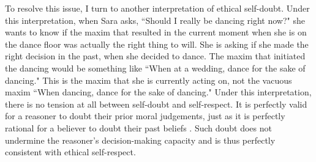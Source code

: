 \begin{isabellebody}
\begin{isamarkuptext}
To resolve this issue, I turn to another interpretation of ethical self-doubt. Under this interpretation, 
when Sara asks, ``Should I really be dancing right now?" she wants to know if the maxim that 
resulted in the current moment when she is on the dance floor was actually 
the right thing to will. She is asking if she made the right 
decision in the past, when she decided to dance. The maxim that initiated the dancing would be something 
like ``When at a wedding, dance for the sake of dancing." This is the maxim that she is currently acting 
on, not the vacuous maxim ``When dancing, dance for the sake of dancing." Under this interpretation, 
there is no tension at all between self-doubt and self-respect. It is perfectly valid for a reasoner 
to doubt their prior moral judgements, just as it is perfectly rational for a believer to doubt their 
past beliefs \cite[3-4]{christensen}. Such doubt does not undermine the reasoner's decision-making 
capacity and is thus perfectly consistent with ethical self-respect. 


\end{isamarkuptext}
\end{isabellebody}
